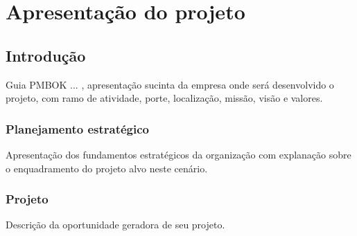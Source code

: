 \part{Apresentação do projeto}

\chapter[Introdução]{Introdução}

Guia PMBOK ... \cite{project2013guia}, apresentação sucinta da empresa onde será desenvolvido o projeto, com ramo de atividade, porte, localização, missão, visão e valores.

\section{Planejamento estratégico}

Apresentação dos fundamentos estratégicos da organização com explanação sobre o enquadramento do projeto alvo neste cenário.

\section{Projeto}

Descrição da oportunidade geradora de seu projeto.

